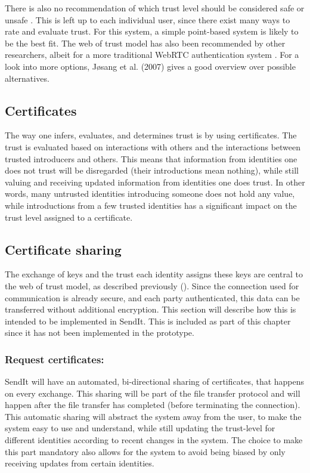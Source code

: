     There is also no recommendation of which trust level should be considered safe or unsafe \cite{ar_pgp}. This is left up to each individual user, since there exist many ways to rate and evaluate trust. For this system, a simple point-based system is likely to be the best fit. The web of trust model has also been recommended by other researchers, albeit for a more traditional WebRTC authentication system \cite{ar_whois}. For a look into more options, J\o sang et al. (2007) \cite{a_trustserv} gives a good overview over possible alternatives.

    \subsection{Certificates}
    The way one infers, evaluates, and determines trust is by using certificates. The trust is evaluated based on interactions with others and the interactions between trusted introducers and others. This means that information from identities one does not trust will be disregarded (their introductions mean nothing), while still valuing and receiving updated information from identities one does trust. In other words, many untrusted identities introducing someone does not hold any value, while introductions from a few trusted identities has a significant impact on the trust level assigned to a certificate.

    \subsection{Certificate sharing}
    The exchange of keys and the trust each identity assigns these keys are central to the web of trust model, as described previously (). Since the connection used for communication is already secure, and each party authenticated, this data can be transferred without additional encryption. This section will describe how this is intended to be implemented in SendIt. This is included as part of this chapter since it has not been implemented in the prototype.
        \subsubsection*{Request certificates:}
        SendIt will have an automated, bi-directional sharing of certificates, that happens on every exchange. This sharing will be part of the file transfer protocol and will happen after the file transfer has completed (before terminating the connection). This automatic sharing will abstract the system away from the user, to make the system easy to use and understand, while still updating the trust-level for different identities according to recent changes in the system. The choice to make this part mandatory also allows for the system to avoid being biased by only receiving updates from certain identities.
